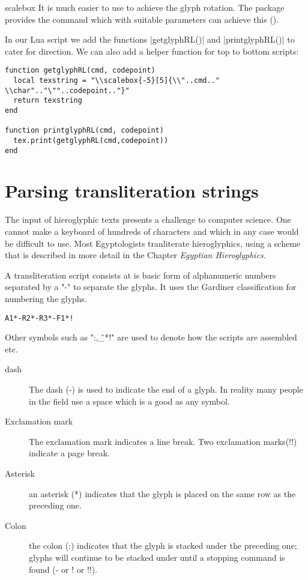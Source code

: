\begin{docCommand}{scalebox} {\oarg{[]} \oarg{[]} }
It is much easier to use \tex to achieve the glyph rotation. The package  provides the command \cmd{\scalebox} which with suitable parameters can achieve this ().
\end{docCommand}

In our Lua script we add the functions |getglyphRL()| and |printglyphRL()| to cater for direction. We can also add a helper function for top to bottom scripts:

\begin{verbatim}
function getglyphRL(cmd, codepoint)
  local texstring = "\\scalebox{-5}[5]{\\"..cmd.." \\char".."\""..codepoint.."}"
  return texstring
end

function printglyphRL(cmd, codepoint)
  tex.print(getglyphRL(cmd,codepoint))
end
\end{verbatim}

\section{Parsing transliteration strings}

The input of hieroglyphic texts presents a challenge to computer science. One cannot make a keyboard of hundreds of characters and which in any case would be difficult to use. 
Most Egyptologists tranliterate hieroglyphics, using a scheme that is described in more detail in the Chapter \textit{Egyptian Hieroglyphics}.

A transliteration script consists at is basic form of alphanumeric numbers separated by a "-" to separate the glyphs. It uses the Gardiner classification for numbering the glyphs.

\begin{center}
\texttt{A1*-R2*-R3*-F1*!}
\end{center}

Other symbols such as ":,\^\_*!" are used to denote how the scripts are assembled etc.

\begin{description}
\item [dash]
The dash (-) is used to indicate the end of a glyph. In reality many people in the field use a space which is a good as any symbol. 
\item [Exclamation mark] The exclamation mark indicates a line break. Two exclamation marks(!!) indicate a page break.

\item [Asterisk] an asterisk (*) indicates that the glyph is placed on the same row as the preceding one.

\item[Colon] the colon (:) indicates that the glyph is stacked under the preceding one; glyphs will continue to be stacked under until a stopping command is found (- or ! or !!).

\end{description}

